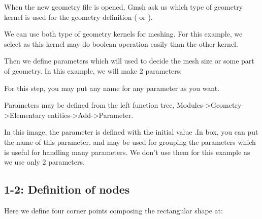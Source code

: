\documentclass[letterpaper,10pt,english]{sphinxmanual}
\begin{document}
When the new geometry file is opened, Gmsh ask us which type of geometry kernel is used for the geometry definition ( or ).



We can use both type of geometry kernels for meshing. For this example, we select  as this kernel may do boolean operation easily than the other kernel.

Then we define parameters which will used to decide the mesh size or some part of geometry. In this example, we will make 2 parameters:

\begin{sphinxVerbatim}[commandchars=\\\{\}]
    
      
\end{sphinxVerbatim}

For this step, you may put any name for any parameter as you want.

Parameters may be defined from the left function tree, Modules-\textgreater{}Geometry-\textgreater{}Elementary entities-\textgreater{}Add-\textgreater{}Parameter.



In this image, the parameter  is defined with the initial value .In  box, you can put the name of this parameter. and  may be used for grouping the parameters which is useful for handling many parameters. We don’t use them for this example as we use only 2 parameters.


\subsection{1-2: Definition of nodes}
\label{\detokenize{meshing:definition-of-nodes}}
Here we define four corner points composing the rectangular shape at:

\begin{sphinxVerbatim}[commandchars=\\\{\}]
    
    
    
    
\end{sphinxVerbatim}
\end{document}
